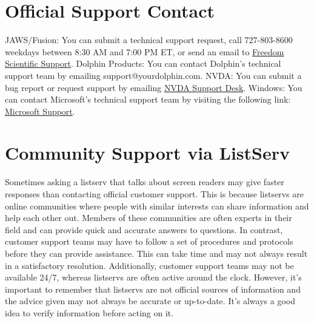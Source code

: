 \documentclass[12pt,letterpaper,twoside]{extreport}
\begin{document}
\begin{appendices}
\hypertarget{report}{}\section{Official Support Contact}\label{report}
JAWS/Fusion: You can submit a technical support request, call 727-803-8600 weekdays between 8:30 AM and 7:00 PM ET, or send an email to \href{support@freedomscientific.com}{Freedom Scientific Support}.
Dolphin Products: You can contact Dolphin’s technical support team by emailing support@yourdolphin.com.
NVDA: You can submit a bug report or request support by emailing \href{info@nvaccess.org}{NVDA Support Desk}.
Windows: You can contact Microsoft’s technical support team by visiting the following link: \href{https://support.microsoft.com/en-us/contactus/}{Microsoft Support}.
\hypertarget{listserv}{}\section{Community Support via ListServ}\label{listserv}
Sometimes asking a listserv that talks about screen readers may give faster responses than contacting official customer support. This is because listservs are online communities where people with similar interests can share information and help each other out. Members of these communities are often experts in their field and can provide quick and accurate answers to questions. In contrast, customer support teams may have to follow a set of procedures and protocols before they can provide assistance. This can take time and may not always result in a satisfactory resolution. Additionally, customer support teams may not be available 24/7, whereas listservs are often active around the clock. However, it’s important to remember that listservs are not official sources of information and the advice given may not always be accurate or up-to-date. It’s always a good idea to verify information before acting on it.


\end{appendices}
\end{document}
